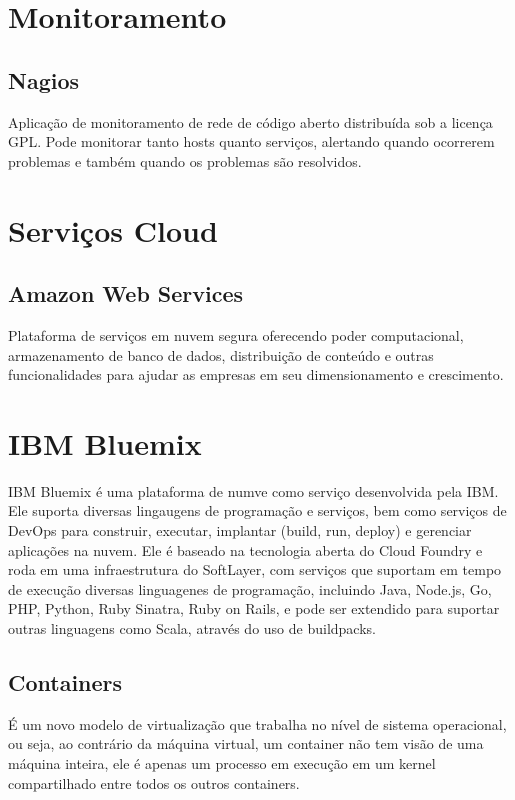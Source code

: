     \section{Monitoramento}

	\subsection{Nagios} Aplicação de monitoramento de rede de código
	aberto distribuída sob a licença GPL. Pode monitorar tanto hosts
	quanto serviços, alertando quando ocorrerem problemas e também
	quando os problemas são resolvidos.

    \section{Serviços Cloud}

	\subsection{Amazon Web Services} Plataforma de serviços em nuvem
	segura oferecendo poder computacional, armazenamento de banco de
	dados, distribuição de conteúdo e outras funcionalidades para
	ajudar as empresas em seu dimensionamento e crescimento.

\section{IBM Bluemix}
IBM Bluemix é uma plataforma de numve como serviço desenvolvida pela IBM. Ele suporta diversas lingaugens de programação e serviços, bem como serviços de DevOps para construir, executar, implantar (build, run, deploy) e gerenciar aplicações na nuvem. Ele é baseado na tecnologia aberta do Cloud Foundry e roda em uma infraestrutura do SoftLayer, com serviços que suportam em tempo de execução diversas linguagenes de programação, incluindo Java, Node.js, Go, PHP, Python, Ruby Sinatra, Ruby on Rails, e pode ser extendido para suportar outras linguagens como Scala, através do uso de buildpacks.


\subsection{Containers}
É um novo modelo de virtualização que trabalha no nível de sistema operacional,
ou seja, ao contrário da máquina virtual, um container não tem visão de uma
máquina inteira, ele é apenas um processo em execução em um kernel compartilhado
entre todos os outros containers.


